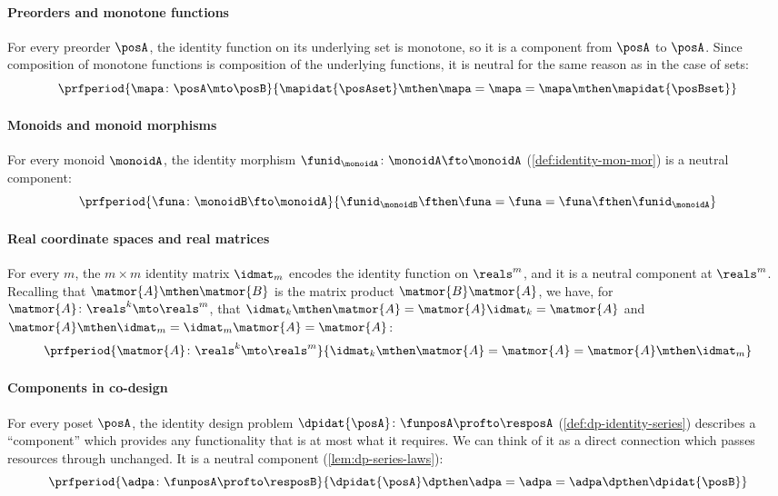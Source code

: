 \paragraph{Preorders and monotone functions}
For every preorder $\posA$, the identity function on its underlying set is monotone, so it is a component from $\posA$ to $\posA$. Since composition of monotone functions is composition of the underlying functions, it is neutral for the same reason as in the case of sets:
\begin{equation}
    \label{eq:neutral-preorders}
    \prfperiod{
        \mapa \colon \posA \mto \posB
    }{
        \mapidat{\posAset} \mthen \mapa = \mapa = \mapa \mthen \mapidat{\posBset}
    }
\end{equation}

\paragraph{Monoids and monoid morphisms}
For every monoid $\monoidA$, the identity morphism $\funid_\monoidA \colon \monoidA \fto \monoidA$ (\cref{def:identity-mon-mor}) is a neutral component:
\begin{equation}
    \label{eq:neutral-monoids}
    \prfperiod{
        \funa \colon \monoidB \fto \monoidA
    }{
        \funid_\monoidB \fthen \funa = \funa = \funa \fthen \funid_\monoidA
    }
\end{equation}

\paragraph{Real coordinate spaces and real matrices}
For every $m$, the $m \times m$ identity matrix $\idmat_m$ encodes the identity function on $\reals^m$, and it is a neutral component at $\reals^m$. Recalling that $\matmor{A} \mthen \matmor{B}$ is the matrix product $\matmor{B}\matmor{A}$, we have, for $\matmor{A} \colon \reals^k \mto \reals^m$, that $\idmat_k \mthen \matmor{A} = \matmor{A}\idmat_k = \matmor{A}$ and $\matmor{A} \mthen \idmat_m = \idmat_m \matmor{A} = \matmor{A}$:
\begin{equation}
    \label{eq:neutral-matrices}
    \prfperiod{
        \matmor{A} \colon \reals^k \mto \reals^m
    }{
        \idmat_k \mthen \matmor{A} = \matmor{A} = \matmor{A} \mthen \idmat_m
    }
\end{equation}

\paragraph{Components in co-design}
For every poset $\posA$, the identity design problem $\dpidat{\posA} \colon \funposA \profto \resposA$ (\cref{def:dp-identity-series}) describes a ``component'' which provides any functionality that is at most what it requires. We can think of it as a direct connection which passes resources through unchanged. It is a neutral component (\cref{lem:dp-series-laws}):
\begin{equation}
    \label{eq:neutral-dp}
    \prfperiod{
        \adpa \colon \funposA \profto \resposB
    }{
        \dpidat{\posA} \dpthen \adpa = \adpa = \adpa \dpthen \dpidat{\posB}
    }
\end{equation}

